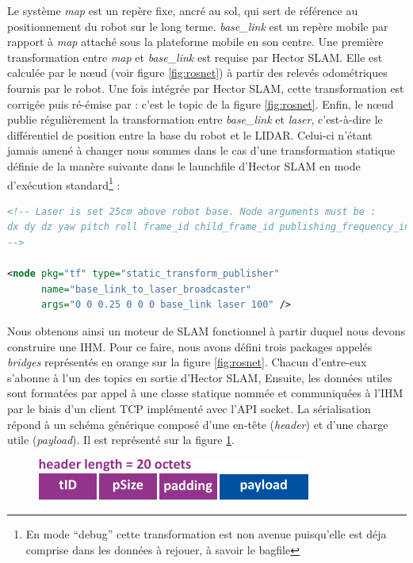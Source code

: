 Le système \emph{map} est un repère fixe, ancré au sol, qui sert de référence au positionnement du robot sur le long terme\cite{Bib_frames}.
\emph{base\_link} est un repère mobile par rapport à \emph{map} attaché sous la plateforme mobile en son centre. Une première transformation entre \emph{map} et \emph{base\_link} est requise par \gls{Hector SLAM}. 
Elle est calculée par le n\oe{}ud  (voir figure \ref{fig:rosnet}) à partir des relevés odométriques fournis par le robot.
Une fois intégrée par \gls{Hector SLAM}, cette transformation est corrigée puis ré-émise par  : c'est le topic  de la figure \ref{fig:rosnet}. 
Enfin, le n\oe{}ud  publie régulièrement la transformation entre \emph{base\_link} et \emph{laser}, c'est-à-dire le différentiel de position entre la base du robot et le \gls{LIDAR}. 
Celui-ci n'étant jamais amené à changer nous sommes dans le cas d'une transformation statique définie de la manère suivante dans le launchfile d'Hector SLAM en mode d'exécution 
standard\footnote{En mode ``debug'' cette transformation est non avenue puisqu'elle est déja comprise dans les données à rejouer, à savoir le bagfile} : 

\begin{lstlisting}[language=xml]
<!-- Laser is set 25cm above robot base. Node arguments must be : 
dx dy dz yaw pitch roll frame_id child_frame_id publishing_frequency_in_ms 
-->

<node pkg="tf" type="static_transform_publisher" 
      name="base_link_to_laser_broadcaster" 
      args="0 0 0.25 0 0 0 base_link laser 100" />  

\end{lstlisting}

Nous obtenons ainsi un moteur de SLAM fonctionnel à partir duquel nous devons construire une \gls{IHM}. 
Pour ce faire, nous avons défini trois packages appelés \emph{bridges} représentés en orange sur la figure \ref{fig:rosnet}. 
Chacun d'entre-eux s'abonne à l'un des topics en sortie d'\gls{Hector SLAM}, 
Ensuite, les données utiles sont formatées par appel à une classe statique nommée  et communiquées à l'\gls{IHM} par le biais d'un client \gls{TCP} implémenté avec l'API socket. 
La sérialisation répond à un schéma générique composé d'une en-tête (\emph{header}) et d'une charge utile (\emph{payload}). Il est représenté sur la figure \ref{fig:buffer}. 

\begin{figure}[h]
  \centering
    \includegraphics[width=.5\linewidth]{figures/buffer}  
  \label{fig:buffer}
\end{figure}

